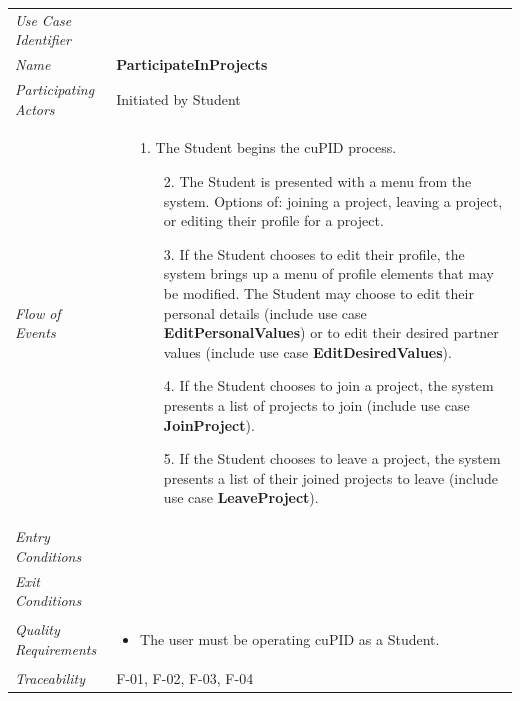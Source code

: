 \documentclass[12pt,letterpaper]{article}
\begin{document}
\begin{center}
	\begin{tabu} to 
		\toprule
		Use Case Identifier & \participateinprojects{} \\
		Name & {\bf ParticipateInProjects} \\
		Participating Actors & Initiated by Student \\

		Flow of Events & 
	    \begin{enumerate}[topsep=-1em,leftmargin=*]
		    \item[1.] The Student begins the cuPID process.
			\begin{enumerate}
				\item[2.] The Student is presented with a menu from the system. Options of: joining a project, leaving a project, or editing their profile for a project.
				\item[3.] If the Student chooses to edit their profile, the system brings up a menu of profile elements that may be modified. The Student may choose to edit their personal details (include use case \textbf{EditPersonalValues}) or to edit their desired partner values (include use case \textbf{EditDesiredValues}).
				\item[4.] If the Student chooses to join a project, the system presents a list of projects to join (include use case \textbf{JoinProject}).
				\item[5.] If the Student chooses to leave a project, the system presents a list of their joined projects to leave (include use case \textbf{LeaveProject}).
			\end{enumerate}
		\end{enumerate} \\

		Entry Conditions & \\

		Exit Conditions & \\ %

		Quality Requirements &
		\begin{itemize}[topsep=-1em,leftmargin=*]
			\item The user must be operating cuPID as a Student.
		\end{itemize} \\

		Traceability & F-01, F-02, F-03, F-04\\

		\toprule
	\end{tabu}
\end{center}
\end{document}
